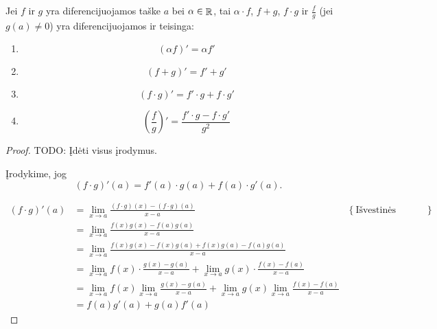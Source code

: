 \begin{prop}
  Jei $f$ ir $g$ yra diferencijuojamos taške $a$ bei 
  $\alpha \in \mathop{\mathbb{R}}$, tai $\alpha \cdot f$, $f + g$, $f \cdot g$ ir
  $\frac{f}{g}$ (jei $g(a) \neq 0$) yra diferencijuojamos ir teisinga:
  \begin{enumerate}
    \item 
      \begin{equation*}
        (\alpha f)' = \alpha f'
      \end{equation*}
    \item 
      \begin{equation*}
        (f + g)' = f' + g'
      \end{equation*}
    \item
      \begin{equation*}
        (f \cdot g)' = f' \cdot g + f \cdot g'
      \end{equation*}
    \item
      \begin{equation*}
        \left( \frac{f}{g} \right)' = \frac{f' \cdot g - f \cdot g'}{g^2}
      \end{equation*}
  \end{enumerate}

  \begin{proof}
    TODO: Įdėti visus įrodymus.
    
    Įrodykime, jog 
    \begin{equation*}
      (f \cdot g)'(a) = f'(a) \cdot g(a) + f(a) \cdot g'(a).
    \end{equation*}

    \begin{align*}
      (f \cdot g)'(a) 
      &= \lim _{x \to a} \frac{(f \cdot g)(x) - (f \cdot g)(a)}{x - a} 
        & \left\{ \text{Išvestinės apibrėžimas.} \right\} \\
      &= \lim _{x \to a} \frac{f(x)g(x) - f(a)g(a)}{x - a} \\
      &= \lim _{x \to a} 
        \frac{f(x)g(x) - f(x)g(a) + f(x)g(a) - f(a)g(a)}{x - a} \\
      &= \lim _{x \to a} f(x) \cdot \frac{g(x) - g(a)}{x - a} + 
        \lim _{x \to a} g(x) \cdot \frac{f(x) - f(a)}{x - a} \\
      &= \lim _{x \to a} f(x) \lim _{x \to a} \frac{g(x) - g(a)}{x - a} +
        \lim _{x \to a} g(x) \lim _{x \to a} \frac{f(x) - f(a)}{x - a} \\
      &= f(a)g'(a) + g(a)f'(a)
    \end{align*}
  \end{proof}
\end{prop}

